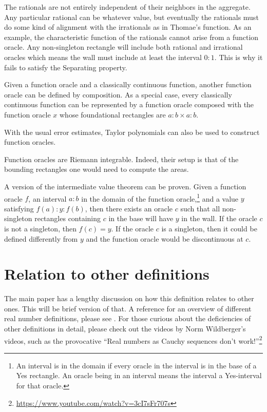 \documentclass[12pt]{article}
\theoremstyle{remark}
\begin{document}
The rationals are not entirely independent of their neighbors in the aggregate. Any particular rational can be whatever value, but eventually the rationals must do some kind of alignment with the irrationals as in Thomae's function. As an example, the characteristic function of the rationals cannot arise from a function oracle. Any non-singleton rectangle will include both rational and irrational oracles which means the wall must include at least the interval $0:1$. This is why it fails to satisfy the Separating property. 

Given a function oracle and a classically continuous function, another function oracle can be defined by composition. As a special case, every classically continuous function can be represented by a function oracle composed with the function oracle $x$ whose foundational rectangles are $a:b \times a:b$.

With the usual error estimates, Taylor polynomials can also be used to construct function oracles. 

Function oracles are Riemann integrable. Indeed, their setup is that of the bounding rectangles one would need to compute the areas. 

A version of the intermediate value theorem can be proven. Given a function oracle $f$, an interval $a:b$ in the domain of the function oracle,\footnote{An interval is in the domain if every oracle in the interval is in the base of a Yes rectangle. An oracle being in an interval means the interval a Yes-interval for that oracle.} and a value $y$ satisfying $f(a):y:f(b)$, then there exists an oracle $c$ such that all non-singleton rectangles containing $c$ in the base will have $y$ in the wall. If the oracle $c$ is not a singleton, then $f(c) = y$. If the oracle $c$ is a singleton, then it could be defined differently from $y$ and the function oracle would be discontinuous at $c$. 

\section{Relation to other definitions}

The main paper has a lengthy discussion on how this definition relates to other ones. This will be brief version of that. A reference for an overview of different real number definitions, please see \cite{ittay-2015}. For those curious about the deficiencies of other definitions in detail, please check out the videos by Norm Wildberger's videos, such as the provocative ``Real numbers as Cauchy sequences don't work!''\footnote{\url{https://www.youtube.com/watch?v=3cI7sFr707s}}
\end{document}
